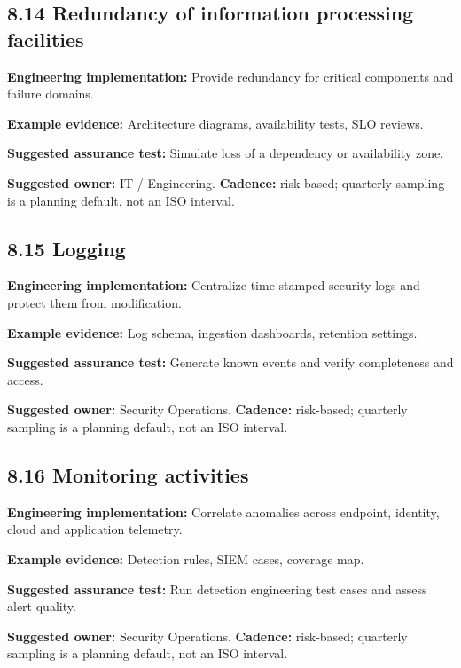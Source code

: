 \documentclass[11pt,letterpaper]{article}
\begin{document}
\subsection{8.14 Redundancy of information processing facilities}
\textbf{Engineering implementation:} Provide redundancy for critical components and failure domains.\par
\textbf{Example evidence:} Architecture diagrams, availability tests, SLO reviews.\par
\textbf{Suggested assurance test:} Simulate loss of a dependency or availability zone.\par
\textbf{Suggested owner:} IT / Engineering. \textbf{Cadence:} risk-based; quarterly sampling is a planning default, not an ISO interval.\par
{}
\subsection{8.15 Logging}
\textbf{Engineering implementation:} Centralize time-stamped security logs and protect them from modification.\par
\textbf{Example evidence:} Log schema, ingestion dashboards, retention settings.\par
\textbf{Suggested assurance test:} Generate known events and verify completeness and access.\par
\textbf{Suggested owner:} Security Operations. \textbf{Cadence:} risk-based; quarterly sampling is a planning default, not an ISO interval.\par
{}
\subsection{8.16 Monitoring activities}
\textbf{Engineering implementation:} Correlate anomalies across endpoint, identity, cloud and application telemetry.\par
\textbf{Example evidence:} Detection rules, SIEM cases, coverage map.\par
\textbf{Suggested assurance test:} Run detection engineering test cases and assess alert quality.\par
\textbf{Suggested owner:} Security Operations. \textbf{Cadence:} risk-based; quarterly sampling is a planning default, not an ISO interval.\par
{}
\end{document}
